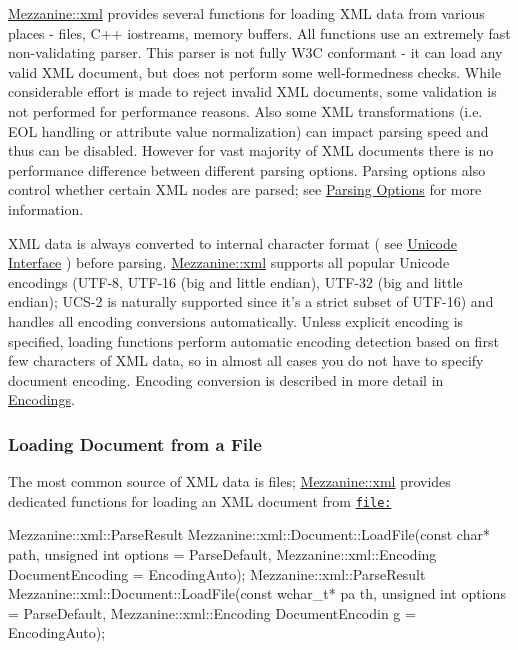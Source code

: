 \hyperlink{namespaceMezzanine_1_1xml}{Mezzanine::xml} provides several functions for loading XML data from various places -\/ files, C++ iostreams, memory buffers. All functions use an extremely fast non-\/validating parser. This parser is not fully W3C conformant -\/ it can load any valid XML document, but does not perform some well-\/formedness checks. While considerable effort is made to reject invalid XML documents, some validation is not performed for performance reasons. Also some XML transformations (i.e. EOL handling or attribute value normalization) can impact parsing speed and thus can be disabled. However for vast majority of XML documents there is no performance difference between different parsing options. Parsing options also control whether certain XML nodes are parsed; see \hyperlink{XMLManual_XMLLoadingParsingOptions}{Parsing Options} for more information. \par
 \par
 XML data is always converted to internal character format ( see \hyperlink{XMLManual_XMLUnicode}{Unicode Interface} ) before parsing. \hyperlink{namespaceMezzanine_1_1xml}{Mezzanine::xml} supports all popular Unicode encodings (UTF-\/8, UTF-\/16 (big and little endian), UTF-\/32 (big and little endian); UCS-\/2 is naturally supported since it's a strict subset of UTF-\/16) and handles all encoding conversions automatically. Unless explicit encoding is specified, loading functions perform automatic encoding detection based on first few characters of XML data, so in almost all cases you do not have to specify document encoding. Encoding conversion is described in more detail in \hyperlink{XMLManual_XMLLoadingEncodings}{Encodings}. \par
 \par
 \hypertarget{XMLManual_XMLLoadingFiles}{}\subsubsection{Loading Document from a File}\label{XMLManual_XMLLoadingFiles}
The most common source of XML data is files; \hyperlink{namespaceMezzanine_1_1xml}{Mezzanine::xml} provides dedicated functions for loading an XML document from \href{file:}{\tt file:} 
\begin{DoxyCode}
 Mezzanine::xml::ParseResult Mezzanine::xml::Document::LoadFile(const char* path,
       unsigned int options = ParseDefault, Mezzanine::xml::Encoding DocumentEncoding =
       EncodingAuto);
 Mezzanine::xml::ParseResult Mezzanine::xml::Document::LoadFile(const wchar_t* pa
      th, unsigned int options = ParseDefault, Mezzanine::xml::Encoding DocumentEncodin
      g = EncodingAuto);
\end{DoxyCode}
